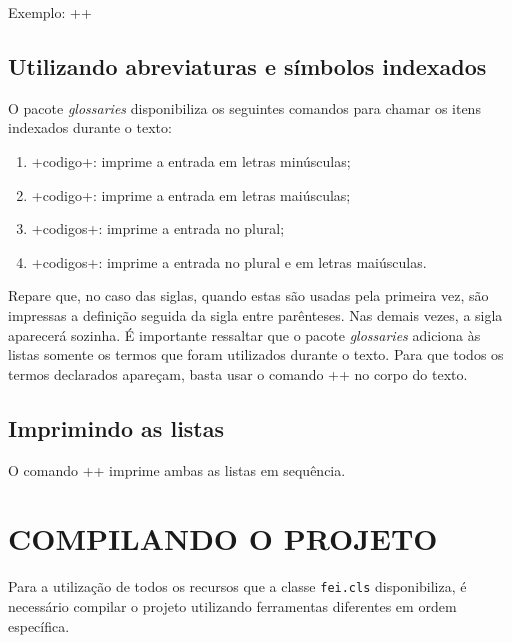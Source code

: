 \documentclass[xindy,rascunho]{fei}
\begin{document}
\begin{teorema}
	Exemplo: \latexinline++

	\section{Utilizando abreviaturas e símbolos indexados}
	
	O pacote \emph{glossaries} disponibiliza os seguintes comandos para chamar os itens indexados durante o texto:
	
	\begin{enumerate}
	\item \latexinline+\gls{codigo}+: imprime a entrada em letras minúsculas;
	\item \latexinline+\Gls{codigo}+: imprime a entrada em letras maiúsculas;
	\item \latexinline+\glspl{codigo}+: imprime a entrada no plural;
	\item \latexinline+\Glspl{codigo}+: imprime a entrada no plural e em letras maiúsculas.
	\end{enumerate}
	
	Repare que, no caso das siglas, quando estas são usadas pela primeira vez, são impressas a definição seguida da sigla entre parênteses. Nas demais vezes, a sigla aparecerá sozinha. É importante ressaltar que o pacote \emph{glossaries} adiciona às listas somente os termos que foram utilizados durante o texto. Para que todos os termos declarados apareçam, basta usar o comando \latexinline+\glsaddall+ no corpo do texto.
	
	\section{Imprimindo as listas}
	
	O comando \latexinline+\printglossaries+ imprime ambas as listas em sequência.

	\chapter{COMPILANDO O PROJETO} \label{chap:compilando}
	
	Para a utilização de todos os recursos que a classe \texttt{fei.cls} disponibiliza, é necessário compilar o projeto utilizando ferramentas diferentes em ordem específica.
	

\end{teorema}
\end{document}
